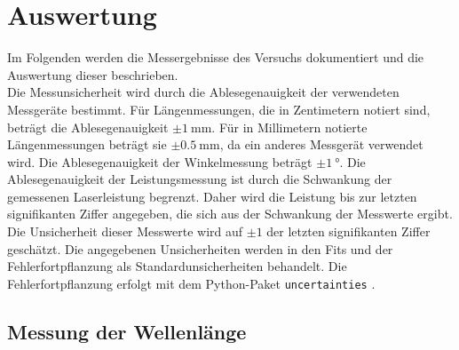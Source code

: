 \newpage
\section{Auswertung}
\label{sec:Auswertung}

\hypersetup{hidelinks}
\AtNextBibliography{\emergencystretch=2em}

Im Folgenden werden die Messergebnisse des Versuchs dokumentiert
und die Auswertung dieser beschrieben. \\

Die Messunsicherheit wird durch die Ablesegenauigkeit der verwendeten Messgeräte bestimmt.
Für Längenmessungen, die in Zentimetern notiert sind, beträgt die Ablesegenauigkeit
$\pm\qty{1}{\milli\meter}$. Für in Millimetern
notierte Längenmessungen beträgt sie $\pm\qty{0.5}{\milli\meter}$, da ein anderes
Messgerät verwendet wird. Die Ablesegenauigkeit der Winkelmessung beträgt
$\pm\qty{1}{\degree}$. Die Ablesegenauigkeit der Leistungsmessung ist durch die Schwankung der gemessenen
Laserleistung begrenzt. Daher wird die Leistung bis zur letzten signifikanten Ziffer angegeben, die sich
aus der Schwankung der Messwerte ergibt. Die Unsicherheit dieser Messwerte wird auf $\pm\num{1}$ der
letzten signifikanten Ziffer geschätzt.
Die angegebenen Unsicherheiten werden in den Fits und der Fehlerfortpflanzung
als Standardunsicherheiten behandelt.
Die Fehlerfortpflanzung erfolgt mit dem Python-Paket \texttt{uncertainties} \cite{uncertainties}.

\subsection{Messung der Wellenlänge}
\label{subsec:v61-wellenlaenge}

